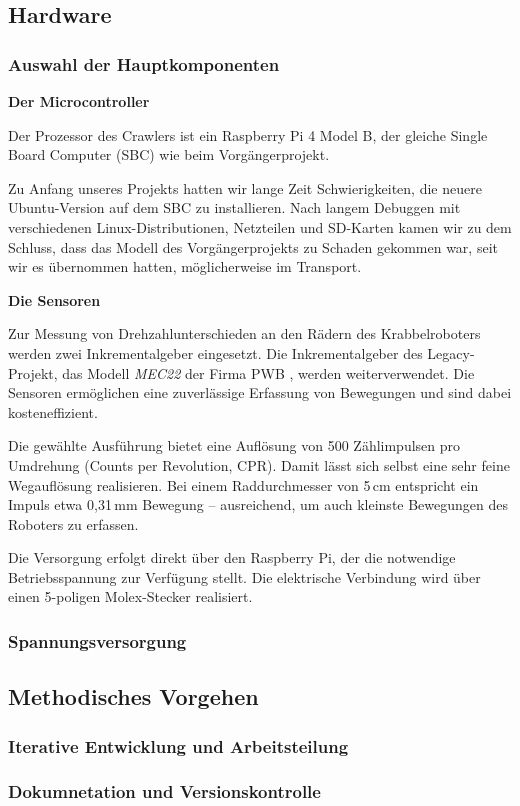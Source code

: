 \subsection{Hardware}

\subsubsection{Auswahl der Hauptkomponenten}

\textbf{Der Microcontroller}

Der Prozessor des Crawlers ist ein Raspberry Pi 4 Model B, der gleiche Single Board Computer (SBC) wie beim Vorgängerprojekt.

Zu Anfang unseres Projekts hatten wir lange Zeit Schwierigkeiten, die neuere Ubuntu-Version auf dem SBC zu installieren. Nach langem Debuggen mit verschiedenen Linux-Distributionen, Netzteilen und SD-Karten kamen wir zu dem Schluss, dass das Modell des Vorgängerprojekts zu Schaden gekommen war, seit wir es übernommen hatten, möglicherweise im Transport.

\textbf{Die Sensoren}

Zur Messung von Drehzahlunterschieden an den Rädern des Krabbelroboters werden zwei Inkrementalgeber eingesetzt. Die Inkrementalgeber des Legacy-Projekt, das Modell \textit{MEC22} der Firma PWB \cite{pwb_me16_datasheet_2011}, werden weiterverwendet. Die Sensoren ermöglichen eine zuverlässige Erfassung von Bewegungen und sind dabei kosteneffizient.

Die gewählte Ausführung bietet eine Auflösung von 500 Zählimpulsen pro Umdrehung (Counts per Revolution, CPR). Damit lässt sich selbst eine sehr feine Wegauflösung realisieren. Bei einem Raddurchmesser von 5\,cm entspricht ein Impuls etwa 0{,}31\,mm Bewegung – ausreichend, um auch kleinste Bewegungen des Roboters zu erfassen.

Die Versorgung erfolgt direkt über den Raspberry Pi, der die notwendige Betriebsspannung zur Verfügung stellt. Die elektrische Verbindung wird über einen 5-poligen Molex-Stecker realisiert.

\subsubsection{Spannungsversorgung}

\subsection{Methodisches Vorgehen}

\subsubsection{Iterative Entwicklung und Arbeitsteilung}
\subsubsection{Dokumnetation und Versionskontrolle}

